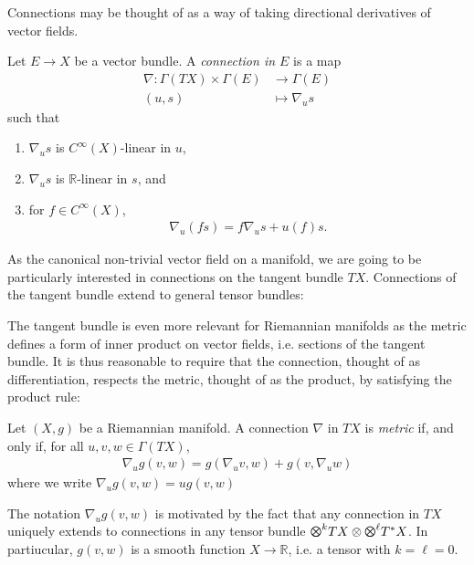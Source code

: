 \documentclass{article}
\begin{document}
Connections may be thought of as a way of taking directional derivatives
of vector fields.

\begin{definition}
  Let $E\to X$ be a vector bundle. A \emph{connection in $E$} is a map
  \begin{align*}
    \nabla : \Gamma(TX) \times \Gamma(E) &\to \Gamma(E) \\
    (u,s) &\mapsto \nabla_u s
  \end{align*}
  such that
  \begin{enumerate}
    \item $\nabla_u s$ is $C^\infty(X)$-linear in $u$,
    \item $\nabla_u s$ is $\mathbb{R}$-linear in $s$, and
    \item for $f\in C^\infty(X)$,
      \begin{align*}
        \nabla_u (fs) = f\nabla_u s + u(f)s.
      \end{align*}
  \end{enumerate}
\end{definition}

As the canonical non-trivial vector field on a manifold,
we are going to be particularly interested in connections on the
tangent bundle $TX$. Connections of the tangent bundle extend to
general tensor bundles:

The tangent bundle is even more relevant for
Riemannian manifolds as the metric defines a form of inner product
on vector fields, i.e. sections of the tangent bundle.
It is thus reasonable to require that the connection, thought of
as differentiation, respects the metric, thought of as the product,
by satisfying the product rule:

\begin{definition}
  Let $(X,g)$ be a Riemannian manifold. A connection $\nabla$ in $TX$ is
  \emph{metric} if, and only if, for all $u,v,w\in\Gamma(TX)$,
  \begin{align*}
    \nabla_u g(v,w) = g(\nabla_u v, w) + g(v,\nabla_u w)
  \end{align*}
  where we write $\nabla_u g(v,w) = u g(v,w)$
\end{definition}

The notation $\nabla_u g(v,w)$ is motivated by the fact that any
connection in $TX$ uniquely extends to connections in any tensor bundle
$\tensor{k}{TX}\otimes\tensor{\ell}{T^*X}$. In partiucular, $g(v,w)$
is a smooth function $X\to\mathbb{R}$, i.e. a tensor with $k=\ell=0$.
\cite{lee2018}
\end{document}
